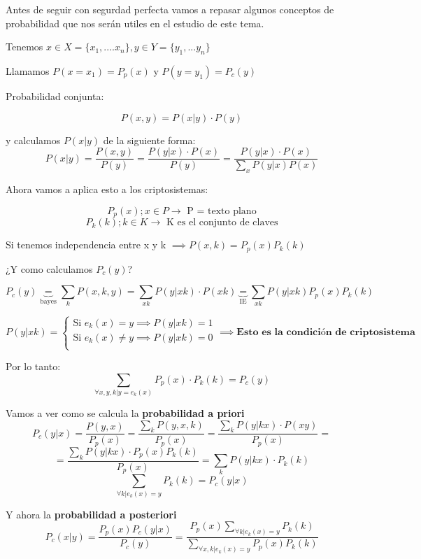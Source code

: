 \begin{remark}
	Antes de seguir con segurdad perfecta vamos a repasar algunos conceptos de probabilidad que nos serán utiles en el estudio de este tema.
	
	Tenemos $x \in X = \{ x_1,....x_n\} , y \in Y = \{ y_1,...y_n\}$
	
	Llamamos $P(x = x_1) = P_p(x)$ y $P(y = y_1) = P_c(y)$
	
	Probabilidad conjunta:
	
	$$P(x,y) = P(x|y)\cdot P(y)$$
	
	y calculamos $P(x|y)$ de la siguiente forma:
	$$P(x|y) = \frac{P(x,y)}{P(y)} = \frac{P(y|x) \cdot P(x)}{P(y)} = \frac{P(y|x) \cdot P(x)}{\sum_{x} P (y|x)P(x)}$$
	
	
	Ahora vamos a aplica esto a los criptosistemas:
	
	$$P_p(x) ; x \in P \rightarrow\text{  P = texto plano}$$
	$$P_k(k) ; k \in K \rightarrow\text{  K es el conjunto de claves}$$
	
	Si tenemos independencia entre x y k $ \implies P(x,k) = P_p(x)P_k(k)$
	
	¿Y como calculamos $P_c(y)$?
	
	$$P_c(y) \underbrace{=}_{\text{bayes}} \sum_{k}P(x,k,y) = \sum_{xk} P(y|xk) \cdot P(xk) \underbrace{=}_{\text{IE}} \sum_{xk} P(y|xk)P_p(x) P_k(k)$$
	
	$$P(y|xk) = \begin{cases}
		\text{Si } e_k(x) = y \implies P(y|xk) = 1\\
		\text{Si } e_k(x) \neq y \implies P(y|xk) = 0\\
	\end{cases} \implies \textbf{Esto es la condición de criptosistema}$$
	
	Por lo tanto:
	$$\sum_{\forall x,y,k| y = e_k(x)} P_p(x) \cdot P_k(k) = P_c(y)$$
	
	Vamos a ver como se calcula la \textbf{probabilidad a priori}
	$$P_c(y|x) = \frac{P(y,x)}{P_p(x)} = \frac{\sum_{k}P(y,x,k)}{P_p(x)} = \frac{\sum_{k}P(y|kx)\cdot P(xy)}{P_p(x)} =$$
	 $$ =\frac{\sum_{k}P(y|kx)\cdot P_p(x)P_k(k)}{P_p(x)} = \sum_{k}P(y|kx)\cdot P_k(k)$$
	$$ \sum_{\forall k | e_k(x)=y} P_k(k) = P_c(y|x)$$
	
	Y ahora la \textbf{probabilidad a posteriori}
	$$P_c(x|y) = \frac{P_p(x) P_c(y|x)}{P_c(y)} = \frac{P_p(x) \sum_{\forall k| e_k(x) = y}P_k(k)}{\sum_{\forall x,k| e_k(x) =y} P_p(x) P_k(k)}$$
	
\end{remark}

